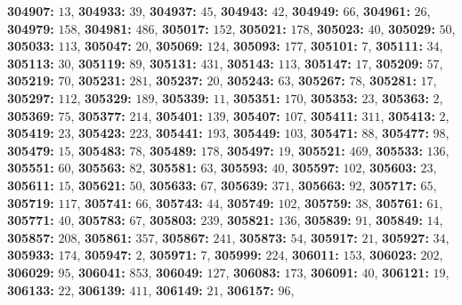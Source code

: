 \textsf{\bfseries 304907:} $13$, \textsf{\bfseries 304933:} $39$, \textsf{\bfseries 304937:} $45$, \textsf{\bfseries 304943:} $42$, \textsf{\bfseries 304949:} $66$, \textsf{\bfseries 304961:} $26$, \textsf{\bfseries 304979:} $158$, \textsf{\bfseries 304981:} $486$, \textsf{\bfseries 305017:} $152$, \textsf{\bfseries 305021:} $178$, \textsf{\bfseries 305023:} $40$, \textsf{\bfseries 305029:} $50$, \textsf{\bfseries 305033:} $113$, \textsf{\bfseries 305047:} $20$, \textsf{\bfseries 305069:} $124$, \textsf{\bfseries 305093:} $177$, \textsf{\bfseries 305101:} $7$, \textsf{\bfseries 305111:} $34$, \textsf{\bfseries 305113:} $30$, \textsf{\bfseries 305119:} $89$, \textsf{\bfseries 305131:} $431$, \textsf{\bfseries 305143:} $113$, \textsf{\bfseries 305147:} $17$, \textsf{\bfseries 305209:} $57$, \textsf{\bfseries 305219:} $70$, \textsf{\bfseries 305231:} $281$, \textsf{\bfseries 305237:} $20$, \textsf{\bfseries 305243:} $63$, \textsf{\bfseries 305267:} $78$, \textsf{\bfseries 305281:} $17$, \textsf{\bfseries 305297:} $112$, \textsf{\bfseries 305329:} $189$, \textsf{\bfseries 305339:} $11$, \textsf{\bfseries 305351:} $170$, \textsf{\bfseries 305353:} $23$, \textsf{\bfseries 305363:} $2$, \textsf{\bfseries 305369:} $75$, \textsf{\bfseries 305377:} $214$, \textsf{\bfseries 305401:} $139$, \textsf{\bfseries 305407:} $107$, \textsf{\bfseries 305411:} $311$, \textsf{\bfseries 305413:} $2$, \textsf{\bfseries 305419:} $23$, \textsf{\bfseries 305423:} $223$, \textsf{\bfseries 305441:} $193$, \textsf{\bfseries 305449:} $103$, \textsf{\bfseries 305471:} $88$, \textsf{\bfseries 305477:} $98$, \textsf{\bfseries 305479:} $15$, \textsf{\bfseries 305483:} $78$, \textsf{\bfseries 305489:} $178$, \textsf{\bfseries 305497:} $19$, \textsf{\bfseries 305521:} $469$, \textsf{\bfseries 305533:} $136$, \textsf{\bfseries 305551:} $60$, \textsf{\bfseries 305563:} $82$, \textsf{\bfseries 305581:} $63$, \textsf{\bfseries 305593:} $40$, \textsf{\bfseries 305597:} $102$, \textsf{\bfseries 305603:} $23$, \textsf{\bfseries 305611:} $15$, \textsf{\bfseries 305621:} $50$, \textsf{\bfseries 305633:} $67$, \textsf{\bfseries 305639:} $371$, \textsf{\bfseries 305663:} $92$, \textsf{\bfseries 305717:} $65$, \textsf{\bfseries 305719:} $117$, \textsf{\bfseries 305741:} $66$, \textsf{\bfseries 305743:} $44$, \textsf{\bfseries 305749:} $102$, \textsf{\bfseries 305759:} $38$, \textsf{\bfseries 305761:} $61$, \textsf{\bfseries 305771:} $40$, \textsf{\bfseries 305783:} $67$, \textsf{\bfseries 305803:} $239$, \textsf{\bfseries 305821:} $136$, \textsf{\bfseries 305839:} $91$, \textsf{\bfseries 305849:} $14$, \textsf{\bfseries 305857:} $208$, \textsf{\bfseries 305861:} $357$, \textsf{\bfseries 305867:} $241$, \textsf{\bfseries 305873:} $54$, \textsf{\bfseries 305917:} $21$, \textsf{\bfseries 305927:} $34$, \textsf{\bfseries 305933:} $174$, \textsf{\bfseries 305947:} $2$, \textsf{\bfseries 305971:} $7$, \textsf{\bfseries 305999:} $224$, \textsf{\bfseries 306011:} $153$, \textsf{\bfseries 306023:} $202$, \textsf{\bfseries 306029:} $95$, \textsf{\bfseries 306041:} $853$, \textsf{\bfseries 306049:} $127$, \textsf{\bfseries 306083:} $173$, \textsf{\bfseries 306091:} $40$, \textsf{\bfseries 306121:} $19$, \textsf{\bfseries 306133:} $22$, \textsf{\bfseries 306139:} $411$, \textsf{\bfseries 306149:} $21$, \textsf{\bfseries 306157:} $96$, 
